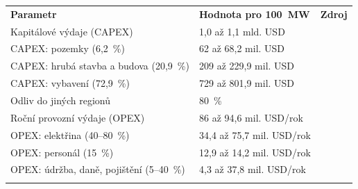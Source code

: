 \begin{landscape} \begin{table}[p] \centering \setlength{\tabcolsep}{26pt}

    \begin{tabular}{llc}
        \toprule
        \addlinespace
        \textbf{Parametr} & \textbf{Hodnota pro 100~MW} & \textbf{Zdroj} \\
        
        \addlinespace
        \midrule
        \addlinespace

        Kapitálové výdaje (CAPEX) & 1,0 až 1,1 mld. USD &~\cite{to_albertas_2025,gargano_subsidizing_2025} \\
        \quad CAPEX: pozemky (6,2~\%) & 62 až 68,2 mil. USD &~\cite{pham_data_2017} \\
        \quad CAPEX: hrubá stavba a budova (20,9~\%) & 209 až 229,9 mil. USD &~\cite{pham_data_2017} \\
        \quad CAPEX: vybavení (72,9~\%) & 729 až 801,9 mil. USD &~\cite{pham_data_2017,ginzburg-ganz_technical_2025} \\
        Odliv do jiných regionů & 80~\% &~\cite{roychoudhury_economic_2025} \\

        \addlinespace
        \midrule
        \addlinespace

        Roční provozní výdaje (OPEX) & 86 až 94,6 mil. USD/rok &~\cite{pham_data_2017,to_albertas_2025} \\
        \quad OPEX: elektřina (40--80~\%) & 34,4 až 75,7 mil. USD/rok &~\cite{pham_data_2017,pratikkumar_dilipkumar_patel_artificial_2025} \\
        \quad OPEX: personál (15~\%) & 12,9 až 14,2 mil. USD/rok &~\cite{pham_data_2017} \\
        \quad OPEX: údržba, daně, pojištění (5--40~\%) & 4,3 až 37,8 mil. USD/rok &~\cite{pham_data_2017} \\

        \addlinespace
        \midrule
        \addlinespace


\end{tabular}
\end{table}
\end{landscape}
